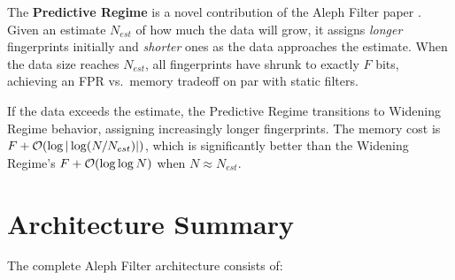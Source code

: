 The \textbf{Predictive Regime} is a novel contribution of the Aleph 
Filter paper \cite{aleph}. Given an estimate $N_{est}$ of how much the 
data will grow, it assigns \emph{longer} fingerprints initially and 
\emph{shorter} ones as the data approaches the estimate. When the 
data size reaches $N_{est}$, all fingerprints have shrunk to exactly 
$F$ bits, achieving an FPR vs.\ memory tradeoff on par with static 
filters.

If the data exceeds the estimate, the Predictive Regime transitions 
to Widening Regime behavior, assigning increasingly longer 
fingerprints. The memory cost is $F + \mathcal{O}(\log|\log(N/N_{est})|)$, 
which is significantly better than the Widening Regime's 
$F + \mathcal{O}(\log \log N)$ when $N \approx N_{est}$.


\section{Architecture Summary}

The complete Aleph Filter architecture consists of:

